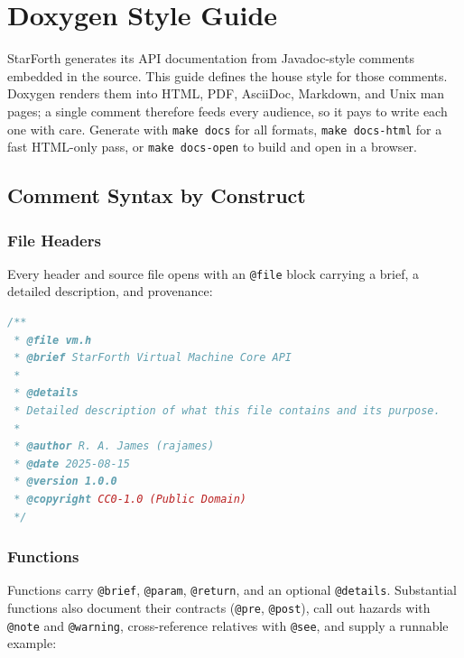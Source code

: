 
\section{Doxygen Style Guide}

StarForth generates its API documentation from Javadoc-style comments embedded
in the source. This guide defines the house style for those comments. Doxygen
renders them into HTML, PDF, AsciiDoc, Markdown, and Unix man pages; a single
comment therefore feeds every audience, so it pays to write each one with care.
Generate with \texttt{make docs} for all formats, \texttt{make docs-html} for a
fast HTML-only pass, or \texttt{make docs-open} to build and open in a browser.

\subsection{Comment Syntax by Construct}

\subsubsection{File Headers}

Every header and source file opens with an \texttt{@file} block carrying a
brief, a detailed description, and provenance:

\begin{lstlisting}[language=C]
/**
 * @file vm.h
 * @brief StarForth Virtual Machine Core API
 *
 * @details
 * Detailed description of what this file contains and its purpose.
 *
 * @author R. A. James (rajames)
 * @date 2025-08-15
 * @version 1.0.0
 * @copyright CC0-1.0 (Public Domain)
 */
\end{lstlisting}

\subsubsection{Functions}

Functions carry \texttt{@brief}, \texttt{@param}, \texttt{@return}, and an
optional \texttt{@details}. Substantial functions also document their
contracts (\texttt{@pre}, \texttt{@post}), call out hazards with
\texttt{@note} and \texttt{@warning}, cross-reference relatives with
\texttt{@see}, and supply a runnable example:

